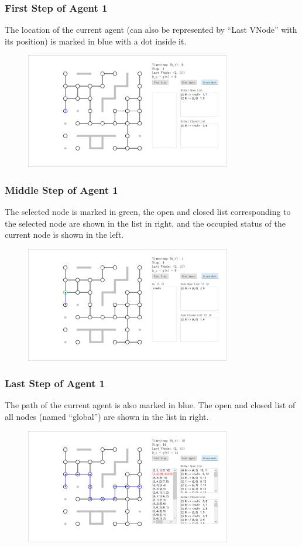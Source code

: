 \documentclass{beamer}
\begin{document}
\begin{frame}
\frametitle{First Step of Agent 1}
The location of the current agent (can also be represented by ``Last VNode'' with its position) is marked in blue with a dot inside it. 
\begin{figure}
\centering
\includegraphics[width=0.8\textwidth]{a1s1.png}
\end{figure}
\end{frame}

\begin{frame}
\frametitle{Middle Step of Agent 1}
The selected node is marked in green, the open and closed list corresponding to the selected node are shown in the list in right, and the occupied status of the current node is shown in the left.
\begin{figure}
\centering
\includegraphics[width=0.8\textwidth]{a1s2.png}
\end{figure}
\end{frame}


\begin{frame}
\frametitle{Last Step of Agent 1}
The path of the current agent is also marked in blue. The open and closed list of all nodes (named ``global'') are shown in the list in right.
\begin{figure}
\centering
\includegraphics[width=0.8\textwidth]{a1s3.png}
\end{figure}
\end{frame}
\end{document}
